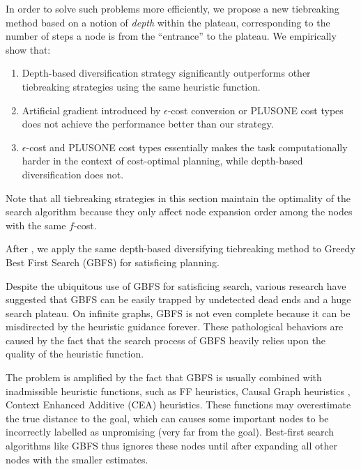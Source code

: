 In order to solve such problems more efficiently, we propose a new
tiebreaking method based on a notion of \emph{depth} within the plateau,
corresponding to the number of steps a node is from the ``entrance'' to
the plateau.  We empirically show that:
\begin{enumerate}
 \item Depth-based diversification strategy significantly outperforms
       other tiebreaking strategies using the same heuristic function.
 \item Artificial gradient introduced by $\epsilon$-cost conversion or
       PLUS\-ONE cost types does not achieve the performance better than
       our strategy.
 \item $\epsilon$-cost and PLUS\-ONE cost types essentially makes the
       task computationally harder in the context of cost-optimal
       planning, while depth-based diversification does not.
\end{enumerate}

Note that all tiebreaking strategies in this section maintain the
optimality of the search algorithm because they only affect node
expansion order among the nodes with the same $f$-cost.


After , we apply the same depth-based diversifying tiebreaking
method to Greedy Best First Search (GBFS) for satisficing planning.

Despite the ubiquitous use of GBFS for satisficing search,
various research have suggested that GBFS can be
easily trapped by undetected dead ends and a huge search plateau.
On infinite graphs, GBFS is not even complete \cite{Valenzano2016}
because it can be misdirected by the heuristic guidance forever.
These pathological behaviors are caused by the fact that 
the search process of GBFS heavily relies upon the
quality of the heuristic function.

The problem is amplified by the fact that GBFS is usually combined
with inadmissible heuristic functions, such as FF
heuristics\cite{Hoffmann01}, Causal Graph heuristics \cite{Helmert2006}, Context Enhanced
Additive (CEA) heuristics\cite{helmert2008unifying}.
These functions may overestimate the true distance to the goal,
which can causes some important nodes to be incorrectly labelled as unpromising
(very far from the goal). Best-first search algorithms like GBFS thus
ignores these nodes until after expanding all other nodes with the smaller estimates.

